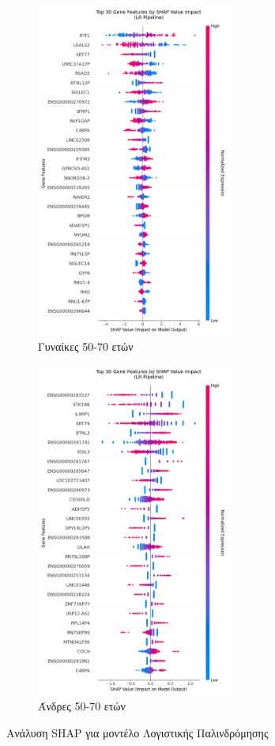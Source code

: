 \documentclass[12pt]{report}
\begin{document}
            \begin{figure}[H]
                \centering
                \begin{subfigure}[b]{0.45\textwidth}
                    \centering
                    \includegraphics[height=11cm,width=\textwidth,keepaspectratio]{ML/Predict/DEG/SHAP/LR/shap_beeswarm_plot_Female_50-70_useSMOTE_False.png}
                    \caption{Γυναίκες 50-70 ετών}
                    \label{fig:shap_beeswarm_LR_plot_Female_50-70_useSMOTE_False}
                \end{subfigure}
                \hfill
                \begin{subfigure}[b]{0.45\textwidth}
                    \centering
                    \includegraphics[height=11cm,width=\textwidth,keepaspectratio]{ML/Predict/DEG/SHAP/LR/shap_beeswarm_plot_Male_50-70_useSMOTE_False.png}
                    \caption{Άνδρες 50-70 ετών}
                    \label{fig:shap_beeswarm_LR_plot_Male_50-70_useSMOTE_False}
                \end{subfigure}
                \caption{Ανάλυση SHAP για μοντέλο Λογιστικής Παλινδρόμησης}
                \label{fig:beeswarm-shap-50-70-lr-classifier}
            \end{figure}
\end{document}
